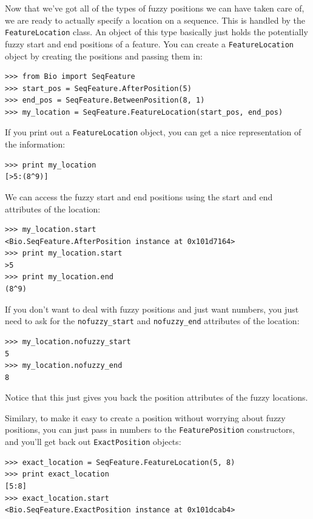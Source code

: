\documentclass{report}
\begin{document}
Now that we've got all of the types of fuzzy positions we can have taken care of, we are ready to actually specify a location on a sequence. This is handled by the \verb|FeatureLocation| class. An object of this type basically just holds the potentially fuzzy start and end positions of a feature. You can create a \verb|FeatureLocation| object by creating the positions and passing them in:

\begin{verbatim}
>>> from Bio import SeqFeature
>>> start_pos = SeqFeature.AfterPosition(5)
>>> end_pos = SeqFeature.BetweenPosition(8, 1)
>>> my_location = SeqFeature.FeatureLocation(start_pos, end_pos)
\end{verbatim}

If you print out a \verb|FeatureLocation| object, you can get a nice representation of the information:

\begin{verbatim}
>>> print my_location
[>5:(8^9)]
\end{verbatim}

We can access the fuzzy start and end positions using the start and end attributes of the location:

\begin{verbatim}
>>> my_location.start
<Bio.SeqFeature.AfterPosition instance at 0x101d7164>
>>> print my_location.start
>5
>>> print my_location.end
(8^9)
\end{verbatim}

If you don't want to deal with fuzzy positions and just want numbers, you just need to ask for the \verb|nofuzzy_start| and \verb|nofuzzy_end| attributes of the location:

\begin{verbatim}
>>> my_location.nofuzzy_start 
5
>>> my_location.nofuzzy_end
8
\end{verbatim}

Notice that this just gives you back the position attributes of the fuzzy locations.


Similary, to make it easy to create a position without worrying about fuzzy positions, you can just pass in numbers to the \verb|FeaturePosition| constructors, and you'll get back out \verb|ExactPosition| objects:

\begin{verbatim}
>>> exact_location = SeqFeature.FeatureLocation(5, 8)
>>> print exact_location
[5:8]
>>> exact_location.start
<Bio.SeqFeature.ExactPosition instance at 0x101dcab4>
\end{verbatim}
\end{document}
